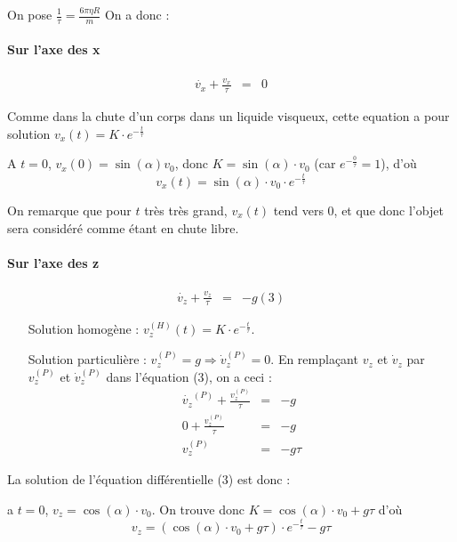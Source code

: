 On pose $\frac{1}{\tau} = \frac{6\pi\eta R}{m}$ On a donc :

\paragraph{Sur l'axe des x}

\[\begin{array}{rcl}
		\dot{v_x} + \frac{v_x}{\tau} &=& 0
\end{array}\]

Comme dans la chute d'un corps dans un liquide visqueux, cette equation a pour solution $v_x(t) = K \cdot e^{-\frac{t}{\tau}}$

A $t=0$, $v_x(0) = \sin(\alpha) v_0$, donc $K = \sin(\alpha)\cdot v_0$ (car $e^{-\frac{0}{\tau}} = 1$), d'où \[v_x(t) = \sin(\alpha)\cdot v_0 \cdot e^{-\frac{t}{\tau}}\]

On remarque que pour $t$ très très grand, $v_x(t)$ tend vers 0, et que donc l'objet sera considéré comme étant en chute libre.
\paragraph{Sur l'axe des z}

\[\begin{array}{rcl}
		\dot{v_z} + \frac{v_z}{\tau} &=& -g (3)
\end{array}\]

\begin{itemize}
	\item[Solution homogène : ] $v_z^{(H)}(t) = K \cdot e^{-\frac{t}{\tau}}$. 
	\item[Solution particulière : ] $v_z^{(P)} = g \Rightarrow \dot{v}_z^{(P)} = 0$. En remplaçant $v_z$ et $\dot{v}_z$ par $v_z^{(P)}$ et $\dot{v}_z^{(P)}$ dans l'équation (3), on a ceci : \[\begin{array}{rcl}
				\dot{v_z}^{(P)} + \frac{v_z^{(P)}}{\tau} &=& -g \\
				0 + \frac{v_z^{(P)}}{\tau} &=& -g \\
				v_z^{(P)} &=& -g\tau
\end{array}\]
\end{itemize}

La solution de l'équation différentielle (3) est donc :
\begin{center}
\end{center}

a $t=0$, $v_z = \cos(\alpha) \cdot v_0$. On trouve donc $K = \cos(\alpha)\cdot v_0 + g \tau$ d'où \[v_z = (\cos(\alpha)\cdot v_0 + g \tau)\cdot e^{-\frac{t}{\tau}} - g\tau\]

